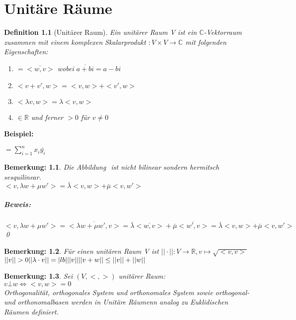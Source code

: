 \documentclass{report}
\newcommand{\lb}{\lambda}
\newcommand{\R}{\mathbb{R}}
\newcommand{\C}{\mathbb{C}}
\newenvironment{beispiel} {
\textbf{Beispiel:}\hfill\break
}{}
\theoremstyle{customrem}
\newtheorem*{bemerkung}{Bemerkung\textnormal:}
\theoremstyle{customdef}
\newtheorem{definition}{Definition}[chapter]
\renewenvironment{proof}{\paragraph{Beweis: }}{\qed}
\theoremstyle{customenv}
\begin{document}
\chapter{Unit\"are R\"aume}

\begin{definition}[Unit\"arer Raum]
  Ein unit\"arer Raum V ist ein \(\C\)-Vektorraum zusammen mit einem komplexen
  Skalarprodukt \(<, > : V \times V \to \C\) mit folgenden Eigenschaften:\\
  \begin{enumerate}
    \item {
      \(<v, w> = \bar{<w, v>}\) wobei \(\overline{a+bi} = a - bi\)
    }
    \item {
      \(<v + v', w> = <v, w> + <v', w>\)
    }
    \item {
      \(<\lb v, w> = \lb <v, w>\)
    }
    \item {
      \(<v, v> \in \R\) und ferner \(<v, v> > 0\) f\"ur \(v \neq 0\)
    }
  \end{enumerate}
\end{definition}

\begin{beispiel}
\(<x, y> = \sum_{i=1}^n x_i \bar{y_i}\)
\end{beispiel}

\begin{bemerkung}
  Die Abbildung \(<, >\) ist nicht bilinear sondern hermitsch sesquilinear.\\
  \(<v, \lb w + \mu w'> = \bar\lb <v, w> + \bar\mu<v, w'>\)
  \begin{proof}
    \(<v, \lb w + \mu w'>
    = \overline{<\lb w + \mu w', v>}
    = \bar\lb \overline{<w, v>} + \bar\mu \overline{<w', v>}
    = \bar\lb<v, w> + \bar\mu<v, w'>
    \)
  \end{proof}
\end{bemerkung}

\begin{bemerkung}
  F\"ur einen unit\"aren Raum V ist \(||\cdot|| : V \to \R, v \mapsto \sqrt{<v, v>}\)\\
  \(
    ||v|| > 0\\
    ||\lb \cdot v|| = |lb| ||v||\\
    ||v + w|| \le ||v|| + ||w||
  \)
\end{bemerkung}

\begin{bemerkung}
  Sei \((V, <, >)\) unit\"arer Raum:\\
  \(v \bot w \Leftrightarrow <v, w> = 0\)\\
  Orthogonalit\"at, orthogonales System und orthonomales System sowie 
  orthogonal- und orthonomalbasen werden in Unit\"are R\"aumenn analog
  zu Euklidischen R\"aumen definiert.
\end{bemerkung}
\end{document}

